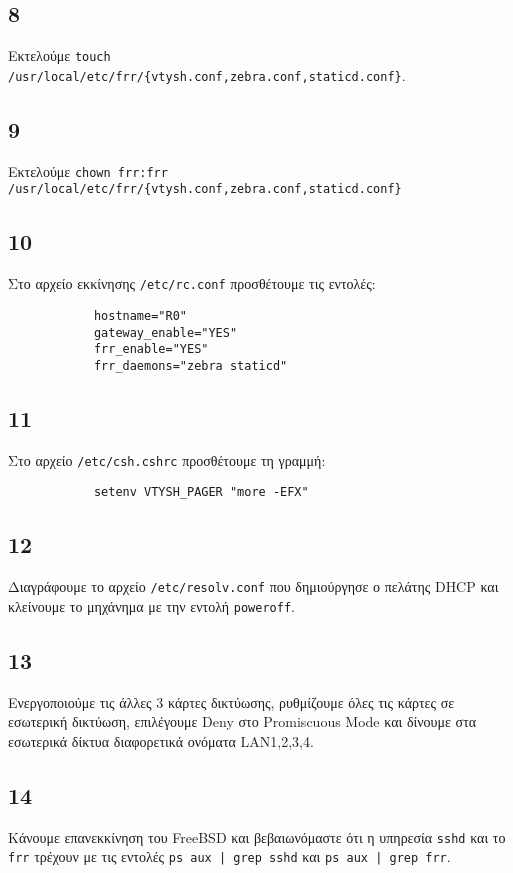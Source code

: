 \documentclass[a4paper, 12pt]{article}
\begin{document}
	\subsection*{8}
		Εκτελούμε \verb|touch /usr/local/etc/frr/{vtysh.conf,zebra.conf,staticd.conf}|.
	
	\subsection*{9}
		Εκτελούμε \verb|chown frr:frr /usr/local/etc/frr/{vtysh.conf,zebra.conf,staticd.conf}|
	
	\subsection*{10}
		Στο αρχείο εκκίνησης \verb|/etc/rc.conf| προσθέτουμε τις εντολές:
		
		\begin{verbatim}
			hostname="R0"
			gateway_enable="YES"
			frr_enable="YES"
			frr_daemons="zebra staticd"
		\end{verbatim}
	
	\subsection*{11}
		Στο αρχείο \verb|/etc/csh.cshrc| προσθέτουμε τη γραμμή:
		
		\begin{verbatim}
			setenv VTYSH_PAGER "more -EFX"
		\end{verbatim}
	
	\subsection*{12}
		Διαγράφουμε το αρχείο \verb|/etc/resolv.conf| που δημιούργησε ο πελάτης DHCP και κλείνουμε το μηχάνημα με την εντολή \verb|poweroff|.
	
	\subsection*{13}
		Ενεργοποιούμε τις άλλες 3 κάρτες δικτύωσης, ρυθμίζουμε όλες τις κάρτες σε εσωτερική δικτύωση, επιλέγουμε Deny στο Promiscuous Mode και δίνουμε στα εσωτερικά δίκτυα διαφορετικά ονόματα LAN1,2,3,4.
	
	\subsection*{14}
		Κάνουμε επανεκκίνηση του FreeBSD και βεβαιωνόμαστε ότι η υπηρεσία \verb|sshd| και το \verb|frr| τρέχουν με τις εντολές \verb+ps aux | grep sshd+ και \verb+ps aux | grep frr+.
	
\end{document}
